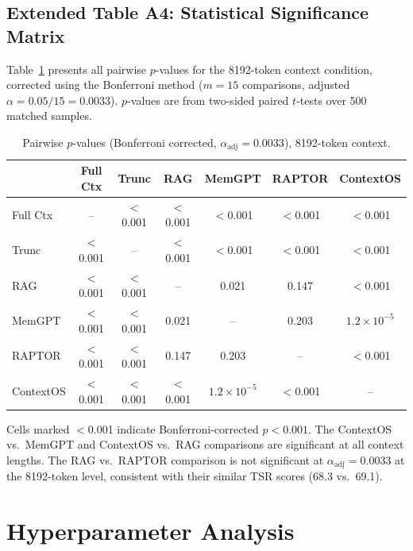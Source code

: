 \subsection{Extended Table A4: Statistical Significance Matrix}

Table~\ref{tab:app_pvalue_matrix} presents all pairwise $p$-values for the
8192-token context condition, corrected using the Bonferroni method
($m = 15$ comparisons, adjusted $\alpha = 0.05 / 15 = 0.0033$).  $p$-values
are from two-sided paired $t$-tests over 500 matched samples.

\begin{table}[h!]
\centering
\caption{Pairwise $p$-values (Bonferroni corrected, $\alpha_{\text{adj}} = 0.0033$), 8192-token context.}
\label{tab:app_pvalue_matrix}
\small
\setlength{\tabcolsep}{5pt}
\begin{tabular}{@{}lcccccc@{}}
\toprule
 & \textbf{Full Ctx} & \textbf{Trunc} & \textbf{RAG} & \textbf{MemGPT} & \textbf{RAPTOR} & \textbf{ContextOS} \\
\midrule
Full Ctx   & --        & $<$0.001  & $<$0.001  & $<$0.001  & $<$0.001  & $<$0.001 \\
Trunc      & $<$0.001  & --        & $<$0.001  & $<$0.001  & $<$0.001  & $<$0.001 \\
RAG        & $<$0.001  & $<$0.001  & --        & 0.021     & 0.147     & $<$0.001 \\
MemGPT     & $<$0.001  & $<$0.001  & 0.021     & --        & 0.203     & $1.2 \times 10^{-5}$ \\
RAPTOR     & $<$0.001  & $<$0.001  & 0.147     & 0.203     & --        & $<$0.001 \\
ContextOS  & $<$0.001  & $<$0.001  & $<$0.001  & $1.2{\times}10^{-5}$ & $<$0.001 & -- \\
\bottomrule
\end{tabular}
\end{table}

\noindent Cells marked $<$0.001 indicate Bonferroni-corrected $p < 0.001$.
The ContextOS vs.\ MemGPT and ContextOS vs.\ RAG comparisons are significant
at all context lengths.  The RAG vs.\ RAPTOR comparison is not significant at
$\alpha_{\text{adj}} = 0.0033$ at the 8192-token level, consistent with their
similar TSR scores (68.3 vs.\ 69.1).


\section{Hyperparameter Analysis}
\label{app:hyperparams}

